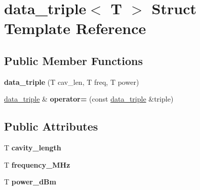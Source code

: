 \hypertarget{structdata__triple}{\section{data\+\_\+triple$<$ T $>$ Struct Template Reference}
\label{structdata__triple}
}
\subsection*{Public Member Functions}
\begin{DoxyCompactItemize}
\item 
\hypertarget{structdata__triple_a223be233f58eb5cb136fb0be322b4cb7}{{\bfseries data\+\_\+triple} (T cav\+\_\+len, T freq, T power)}\label{structdata__triple_a223be233f58eb5cb136fb0be322b4cb7}

\item 
\hypertarget{structdata__triple_a7da3f3ea534c4217ad69b110b087398c}{\hyperlink{structdata__triple}{data\+\_\+triple} \& {\bfseries operator=} (const \hyperlink{structdata__triple}{data\+\_\+triple} \&triple)}\label{structdata__triple_a7da3f3ea534c4217ad69b110b087398c}

\end{DoxyCompactItemize}
\subsection*{Public Attributes}
\begin{DoxyCompactItemize}
\item 
\hypertarget{structdata__triple_a0c009762d01c841ed025b80a12955419}{T {\bfseries cavity\+\_\+length}}\label{structdata__triple_a0c009762d01c841ed025b80a12955419}

\item 
\hypertarget{structdata__triple_a50bc0714de99feb9e3fcb1fa868d082b}{T {\bfseries frequency\+\_\+\+M\+Hz}}\label{structdata__triple_a50bc0714de99feb9e3fcb1fa868d082b}

\item 
\hypertarget{structdata__triple_a6f88f895f5d91c784ef723e87d904c14}{T {\bfseries power\+\_\+d\+Bm}}\label{structdata__triple_a6f88f895f5d91c784ef723e87d904c14}

\end{DoxyCompactItemize}
